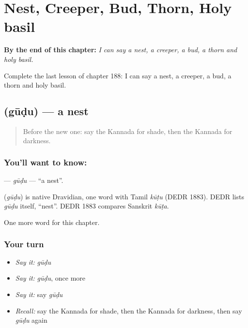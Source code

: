 
\chapter{Nest, Creeper, Bud, Thorn, Holy basil}
\label{ch:ka-nest-creeper-bud-thorn-holy-basil}

\begin{chapteropening}
\textbf{By the end of this chapter:} \emph{I can say a nest, a creeper, a bud, a thorn and holy basil.}

Complete the last lesson of chapter 188: I can say a nest, a creeper, a bud, a thorn and holy basil.
\end{chapteropening}

\section[\texorpdfstring{\kn{ಗೂಡು} (gūḍu)}{ಗೂಡು (gūḍu)}]{ (gūḍu) — a nest}

\label{lesson:KA-C188-gudu}



\begin{quote}
Before the new one: say the Kannada for shade, then the Kannada for darkness.
\end{quote}

\subsection*{You'll want to know: }
\textbf{} — \emph{gūḍu} — \textquotedblleft{}a nest\textquotedblright{}.

\begin{cousinweb}
\textbf{} (\emph{gūḍu}) is native Dravidian, one word with Tamil \emph{kūṭu} (DEDR 1883). DEDR lists \emph{gūḍu} itself, \textquotedblleft{}nest\textquotedblright{}. DEDR 1883 compares Sanskrit \emph{kūṭa}.
\end{cousinweb}

\begin{grammarlens}[title={What you've built}]
One more word for this chapter.
\end{grammarlens}

\subsection*{Your turn}
\begin{itemize}
\raggedright
  \item \emph{Say it:} \emph{gūḍu}
  \item \emph{Say it:} \emph{gūḍu}, once more
  \item \emph{Say it:} say \emph{gūḍu}
  \item \emph{Recall:} say the Kannada for shade, then the Kannada for darkness, then say \emph{gūḍu} again
\end{itemize}

